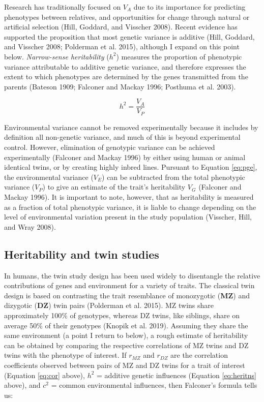 \documentclass[
]{book}
\begin{document}
Research has traditionally focused on \(V_A\) due to its importance for predicting phenotypes between relatives, and opportunities for change through natural or artificial selection (Hill, Goddard, and Visscher 2008). Recent evidence has supported the proposition that most genetic variance is additive (Hill, Goddard, and Visscher 2008; Polderman et al. 2015), although I expand on this point below. \emph{Narrow-sense heritability} (\(h^2\)) measures the proportion of phenotypic variance attributable to additive genetic variance, and therefore expresses the extent to which phenotypes are determined by the genes transmitted from the parents (Bateson 1909; Falconer and Mackay 1996; Posthuma et al. 2003).

\begin{equation}
h^2 = \frac{V_A}{V_P} \label{eq:heritns}
\end{equation}

Environmental variance cannot be removed experimentally because it includes by definition all non-genetic variance, and much of this is beyond experimental control. However, elimination of genotypic variance can be achieved experimentally (Falconer and Mackay 1996) by either using human or animal identical twins, or by creating highly inbred lines. Pursuant to Equation \eqref{eq:pge}, the environmental variance (\(V_E\)) can be subtracted from the total phenotypic variance (\(V_P\)) to give an estimate of the trait's heritability \(V_G\) (Falconer and Mackay 1996). It is important to note, however, that as heritability is measured as a fraction of total phenotypic variance, it is liable to change depending on the level of environmental variation present in the study population (Visscher, Hill, and Wray 2008).

\hypertarget{heritability-and-twin-studies}{%
\subsection{Heritability and twin studies}\label{heritability-and-twin-studies}}

In humans, the twin study design has been used widely to disentangle the relative contributions of genes and environment for a variety of traits. The classical twin design is based on contrasting the trait resemblance of monozygotic (\textbf{MZ}) and dizygotic (\textbf{DZ}) twin pairs (Polderman et al. 2015). MZ twins share approximately 100\% of genotypes, whereas DZ twins, like siblings, share on average 50\% of their genotypes (Knopik et al. 2019). Assuming they share the same environment (a point I return to below), a rough estimate of heritability can be obtained by comparing the respective correlations of MZ twins and DZ twins with the phenotype of interest. If \(r_{MZ}\) and \(r_{DZ}\) are the correlation coefficients observed between pairs of MZ and DZ twins for a trait of interest (Equation \eqref{eq:cor} above), \(h^2\) = additive genetic influences (Equation \eqref{eq:heritns} above), and \(c^2\) = common environmental influences, then Falconer's formula tells us:
\end{document}

